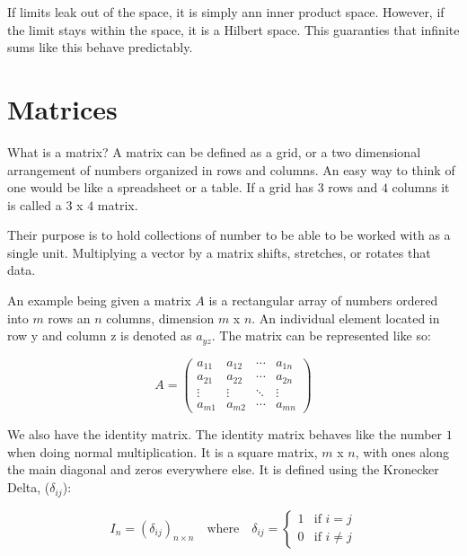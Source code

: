 \documentclass[12pt]{article}
\begin{document}
 If limits leak out of the space, it is simply ann inner product space. However, if the limit stays within the space, it is a Hilbert space. This guaranties that infinite sums like this behave predictably.

\section{Matrices}

What is a matrix? A matrix can be defined as a grid, or a two dimensional arrangement of numbers organized in rows and columns. An easy way to think of one would be like a spreadsheet or a table. If a grid has $3$ rows and $4$ columns it is called a $3$ x $4$
\vspace{0.5cm}
matrix.

Their purpose is to hold collections of number to be able to be worked with as a single unit.
\vspace{0.5cm} 
Multiplying a vector by a matrix shifts, stretches, or rotates that data.

An example being given a matrix $A$ is a rectangular array of numbers ordered into $m$ rows an $n$ columns, dimension $m$ x $n$. An individual element located in row y and column z is denoted as $a_{yz}$. The matrix can be represented like so:

\begin{equation}
A=\begin{pmatrix}a_{11}&a_{12}&\cdots &a_{1n}\\ a_{21}&a_{22}&\cdots &a_{2n}\\ \vdots &\vdots &\ddots &\vdots \\ a_{m1}&a_{m2}&\cdots &a_{mn}\end{pmatrix} \tag{12}
\end{equation}
\vspace{0.1cm}

We also have the identity matrix. The identity matrix behaves like the number $1$ when doing normal multiplication. It is a square matrix, $m$ x $n$, with ones along the main diagonal and zeros everywhere else. It is defined using the Kronecker Delta, ($\delta _{ij}$):

\begin{equation}
I_{n}=(\delta _{ij})_{n\times n}\quad \text{where}\quad \delta _{ij}=\begin{cases}1&\text{if\ }i=j\\ 0&\text{if\ }i\ne j\end{cases} \tag{13}
\end{equation}
\end{document}
